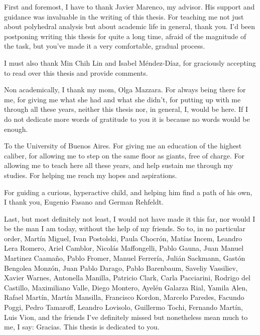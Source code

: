 First and foremost, I have to thank Javier Marenco, my advisor. His support and guidance was invaluable in the writing of this thesis. For teaching me not just about polyhedral analysis but about academic life in general, thank you. I'd been postponing writing this thesis for quite a long time, afraid of the magnitude of the task, but you've made it a very comfortable, gradual process.

I must also thank Min Chih Lin and Isabel Méndez-Díaz, for graciously accepting to read over this thesis and provide comments.

Non academically, I thank my mom, Olga Mazzara. For always being there for me, for giving me what she had and what she didn't, for putting up with me through all these years, neither this thesis nor, in general, I, would be here. If I do not dedicate more words of gratitude to you it is because no words would be enough.

To the University of Buenos Aires. For giving me an education of the highest caliber, for allowing me to step on the same floor as giants, free of charge. For allowing me to teach here all these years, and help sustain me through my studies. For helping me reach my hopes and aspirations.

For guiding a curious, hyperactive child, and helping him find a path of his own, I thank you, Eugenio Fasano and German Rehfeldt.

Last, but most definitely not least, I would not have made it this far, nor would I be the man I am today, without the help of my friends. So to, in no particular order, Martín Miguel, Ivan Postolski, Paula Chocrón, Matías Incem, Leandro Lera Romero, Ariel Camblor, Nicolás Maffongelli, Pablo Gauna, Juan Manuel Martinez Caamaño, Pablo Fromer, Manuel Ferrería, Julián Sackmann, Gastón Bengolea Monzón, Juan Pablo Darago, Pablo Barenbaum, Saveliy Vassiliev, Xavier Warnes, Antonella Manilla, Patricio Clark, Carla Pacciarini, Rodrigo del Castillo, Maximiliano Valle, Diego Montero, Ayelén Galarza Rial, Yamila Alen, Rafael Martín, Martín Mansilla, Francisco Kordon, Marcelo Paredes, Facundo Poggi, Pedro Tamaroff, Leandro Lovisolo, Guillermo Tochi, Fernando Martín, Luis Vion, and the friends I've definitely missed but nonetheless mean much to me, I say: Gracias. This thesis is dedicated to you.
